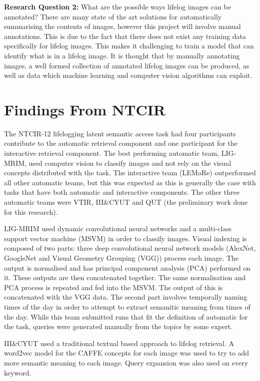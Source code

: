 \documentclass[12pt,a4paper]{article}
\begin{document}
\textbf{Research Question 2:} What are the possible ways lifelog images can be annotated? There are many state of the art solutions for automatically summarising the contents of images, however this project will involve manual annotations. This is due to the fact that there does not exist any training data specifically for lifelog images. This makes it challenging to train a model that can identify what is in a lifelog image. It is thought that by manually annotating images, a well formed collection of annotated lifelog images can be produced, as well as data which machine learning and computer vision algorithms can exploit.

\section{Findings From NTCIR}

The NTCIR-12 lifelogging latent semantic access task had four participants contribute to the automatic retrieval component and one participant for the interactive retrieval component. The best performing automatic team, LIG-MRIM, used computer vision to classify images and not rely on the visual concepts distributed with the task. The interactive team (LEMoRe) outperformed all other automatic teams, but this was expected as this is generally the case with tasks that have both automatic and interactive components. The other three automatic teams were VTIR, III\&CYUT and QUT (the preliminary work done for this research).

LIG-MRIM used dynamic convolutional neural networks and a multi-class support vector machine (MSVM) in order to classify images. Visual indexing is composed of two parts: three deep convolutional neural network models (AlexNet, GoogleNet and Visual Geometry Grouping (VGG)) process each image. The output is normalised and has principal component analysis (PCA) performed on it. These outputs are then concatenated together. The same normalisation and PCA process is repeated and fed into the MSVM. The output of this is concatenated with the VGG data. The second part involves temporally naming times of the day in order to attempt to extract semanitic meaning from times of the day. While this team submitted runs that fit the definition of automatic for the task, queries were generated manually from the topics by some expert.

III\&CYUT used a traditional textual based approach to lifelog retrieval. A word2vec model for the CAFFE concepts for each image was used to try to add more semantic meaning to each image. Query expansion was also used on every keyword.
\end{document}
